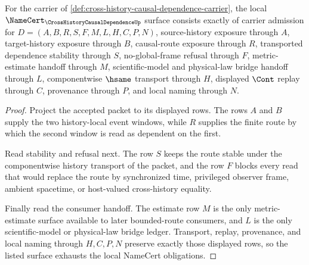 \begin{theorem}
\label{thm:cross-history-causal-dependence-namecert-obligations}
For the carrier of \autoref{def:cross-history-causal-dependence-carrier}, the local $\NameCert_{\CrossHistoryCausalDependenceUp}$ surface consists exactly of carrier admission for $D=(A,B,R,S,F,M,L,H,C,P,N)$, source-history exposure through $A$, target-history exposure through $B$, causal-route exposure through $R$, transported dependence stability through $S$, no-global-frame refusal through $F$, metric-estimate handoff through $M$, scientific-model and physical-law bridge handoff through $L$, componentwise $\hsame$ transport through $H$, displayed $\Cont$ replay through $C$, provenance through $P$, and local naming through $N$.
\end{theorem}
\begin{proof}
Project the accepted packet to its displayed rows. The rows $A$ and $B$ supply the two history-local event windows, while $R$ supplies the finite route by which the second window is read as dependent on the first.

Read stability and refusal next. The row $S$ keeps the route stable under the componentwise history transport of the packet, and the row $F$ blocks every read that would replace the route by synchronized time, privileged observer frame, ambient spacetime, or host-valued cross-history equality.

Finally read the consumer handoff. The estimate row $M$ is the only metric-estimate surface available to later bounded-route consumers, and $L$ is the only scientific-model or physical-law bridge ledger. Transport, replay, provenance, and local naming through $H,C,P,N$ preserve exactly those displayed rows, so the listed surface exhausts the local NameCert obligations.
\end{proof}

